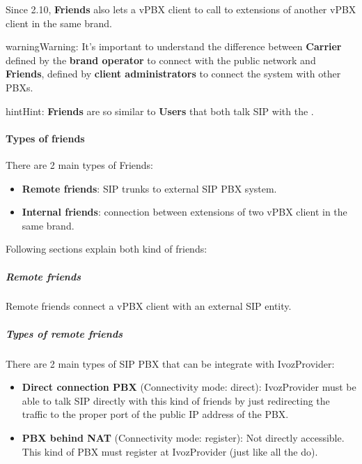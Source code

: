\documentclass[letterpaper,10pt,english]{sphinxmanual}
\begin{document}
Since 2.10, \textbf{Friends} also lets a vPBX client to call to extensions of another
vPBX client in the same brand.

\begin{notice}{warning}{Warning:}
It's important to understand the difference between \textbf{Carrier}
defined by the \textbf{brand operator} to connect with the public network
and \textbf{Friends}, defined by \textbf{client administrators} to connect the
system with other PBXs.
\end{notice}

\begin{notice}{hint}{Hint:}
\textbf{Friends} are so similar to \textbf{Users} that both talk SIP with the
{\hyperref[administration_portal/platform/infrastructure/proxy_users:proxyusers]{}}.
\end{notice}


\paragraph{Types of friends}
\label{administration_portal/client/vpbx/routing_endpoints/friends/index:types-of-friends}
There are 2 main types of Friends:
\begin{itemize}
\item {} 
\textbf{Remote friends}: SIP trunks to external SIP PBX system.

\item {} 
\textbf{Internal friends}: connection between extensions of two vPBX client in the same brand.

\end{itemize}

Following sections explain both kind of friends:


\subparagraph{Remote friends}
\label{administration_portal/client/vpbx/routing_endpoints/friends/remote_friends:remote-friends}\label{administration_portal/client/vpbx/routing_endpoints/friends/remote_friends::doc}
Remote friends connect a vPBX client with an external SIP entity.


\subparagraph{Types of remote friends}
\label{administration_portal/client/vpbx/routing_endpoints/friends/remote_friends:types-of-remote-friends}
There are 2 main types of SIP PBX that can be integrate with IvozProvider:
\begin{itemize}
\item {} 
\textbf{Direct connection PBX} (Connectivity mode: direct): IvozProvider must be able to talk SIP directly with
this kind of friends by just redirecting the traffic to the proper port of
the public IP address of the PBX.

\item {} 
\textbf{PBX behind NAT} (Connectivity mode: register): Not directly accessible. This kind of PBX must register at
IvozProvider (just like all the {\hyperref[administration_portal/client/vpbx/terminals:terminals]{}} do).

\end{itemize}
\end{document}
